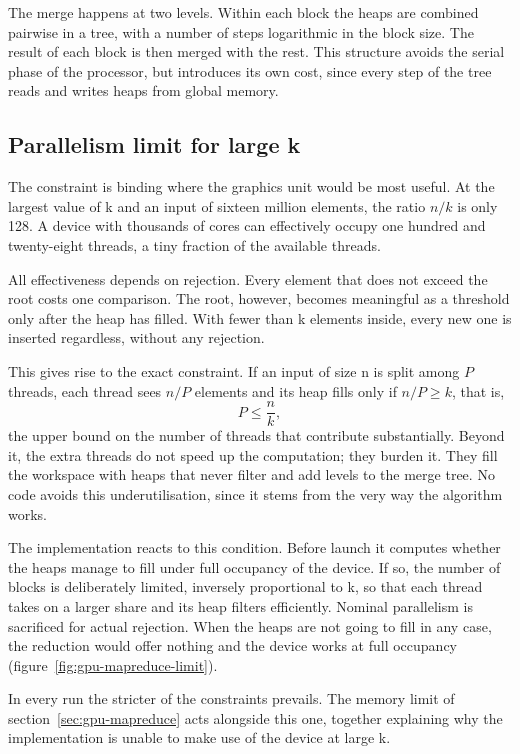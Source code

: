 The merge happens at two levels. Within each block the heaps are combined
pairwise in a tree, with a number of steps logarithmic in the block size. The
result of each block is then merged with the rest. This structure avoids the
serial phase of the processor, but introduces its own cost, since every step of
the tree reads and writes heaps from global memory.

\subsection{Parallelism limit for large k}
\label{sec:gpu-mapreduce-limit}

The constraint is binding where the graphics unit would be most useful. At the
largest value of k and an input of sixteen million elements, the ratio $n/k$ is
only 128. A device with thousands of cores can effectively occupy one hundred
and twenty-eight threads, a tiny fraction of the available threads.

All effectiveness depends on rejection. Every element that does not exceed the
root costs one comparison. The root, however, becomes meaningful as a threshold
only after the heap has filled. With fewer than k elements inside, every new
one is inserted regardless, without any rejection.

This gives rise to the exact constraint. If an input of size n is split among
$P$ threads, each thread sees $n/P$ elements and its heap fills only if $n/P
\geq k$, that is,
\[ P \leq \frac{n}{k}, \]
the upper bound on the number of threads that contribute substantially. Beyond
it, the extra threads do not speed up the computation; they burden it. They
fill the workspace with heaps that never filter and add levels to the merge
tree. No code avoids this underutilisation, since it stems from the very way
the algorithm works.

The implementation reacts to this condition. Before launch it computes whether
the heaps manage to fill under full occupancy of the device. If so, the number
of blocks is deliberately limited, inversely proportional to k, so that each
thread takes on a larger share and its heap filters efficiently. Nominal
parallelism is sacrificed for actual rejection. When the heaps are not going to
fill in any case, the reduction would offer nothing and the device works at
full occupancy (figure~\ref{fig:gpu-mapreduce-limit}).

In every run the stricter of the constraints prevails. The memory limit of
section~\ref{sec:gpu-mapreduce} acts alongside this one, together explaining
why the implementation is unable to make use of the device at large k.

